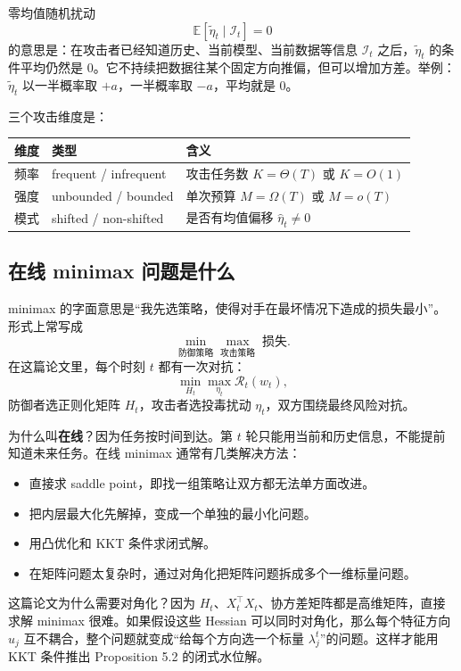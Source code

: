 \documentclass[UTF8,fontset=none,11pt]{ctexart}
\theoremstyle{cnstyle}
\newcommand{\E}{\mathbb{E}}
\newcommand{\calR}{\mathcal{R}}
\newcommand{\calI}{\mathcal{I}}
\begin{document}
零均值随机扰动
\[
  \E[\tilde\eta_t\mid\calI_t]=0
\]
的意思是：在攻击者已经知道历史、当前模型、当前数据等信息 \(\calI_t\) 之后，\(\tilde\eta_t\) 的条件平均仍然是 0。它不持续把数据往某个固定方向推偏，但可以增加方差。举例：\(\tilde\eta_t\) 以一半概率取 \(+a\)，一半概率取 \(-a\)，平均就是 0。

三个攻击维度是：

\begin{center}
\begin{tabular}{lll}
\toprule
维度 & 类型 & 含义 \\
\midrule
频率 & frequent / infrequent & 攻击任务数 \(K=\Theta(T)\) 或 \(K=O(1)\) \\
强度 & unbounded / bounded & 单次预算 \(M=\Omega(T)\) 或 \(M=o(T)\) \\
模式 & shifted / non-shifted & 是否有均值偏移 \(\hat\eta_t\neq 0\) \\
\bottomrule
\end{tabular}
\end{center}

\subsection{在线 minimax 问题是什么}

minimax 的字面意思是“我先选策略，使得对手在最坏情况下造成的损失最小”。形式上常写成
\[
  \min_{\text{防御策略}}\max_{\text{攻击策略}}\;\text{损失}.
\]
在这篇论文里，每个时刻 \(t\) 都有一次对抗：
\[
  \min_{H_t}\max_{\eta_t}\calR_t(w_t),
\]
防御者选正则化矩阵 \(H_t\)，攻击者选投毒扰动 \(\eta_t\)，双方围绕最终风险对抗。

为什么叫\textbf{在线}？因为任务按时间到达。第 \(t\) 轮只能用当前和历史信息，不能提前知道未来任务。在线 minimax 通常有几类解决方法：
\begin{itemize}
  \item 直接求 saddle point，即找一组策略让双方都无法单方面改进。
  \item 把内层最大化先解掉，变成一个单独的最小化问题。
  \item 用凸优化和 KKT 条件求闭式解。
  \item 在矩阵问题太复杂时，通过对角化把矩阵问题拆成多个一维标量问题。
\end{itemize}

这篇论文为什么需要对角化？因为 \(H_t\)、\(X_t^\top X_t\)、协方差矩阵都是高维矩阵，直接求解 minimax 很难。如果假设这些 Hessian 可以同时对角化，那么每个特征方向 \(u_j\) 互不耦合，整个问题就变成“给每个方向选一个标量 \(\lambda_j^t\)”的问题。这样才能用 KKT 条件推出 Proposition 5.2 的闭式水位解。
\end{document}
